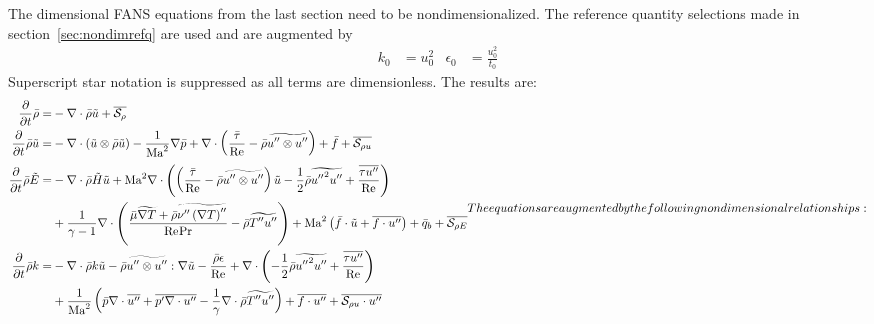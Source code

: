 The dimensional FANS equations from the last section need to be
nondimensionalized.   The reference quantity selections made in
section~\ref{sec:nondimrefq} are used and are augmented by
\begin{align}
  k_0 &= u_{0}^2
&
  \epsilon_0 &= \frac{u_{0}^2}{t_0}
\end{align}
Superscript star notation is suppressed as all terms
are dimensionless.  The results are:
\begin{subequations}
\begin{align}
    \frac{\partial}{\partial{}t}\bar{\rho}
=
 &- \nabla\cdot\bar{\rho}\tilde{u}
  + \overline{\Ssd_{\rho{}}}
\\
    \frac{\partial{}}{\partial{}t}\bar{\rho}\tilde{u}
=
 &- \nabla\cdot(\tilde{u}\otimes\bar{\rho}\tilde{u})
  - \frac{1}{\Mach^2}\nabla{}\bar{p}
  + \nabla\cdot\left(
        \frac{\bar{\tau}}{\Reynolds}
      - \bar{\rho} \widetilde{u''\otimes{}u''}
    \right)
  + \bar{f}
  + \overline{\Ssd_{\rho{} u}}
\\
  \frac{\partial}{\partial{}t} \bar{\rho}\tilde{E}
=
 &- \nabla\cdot\bar{\rho}\tilde{H}\tilde{u}
  + \Mach^{2} \nabla\cdot\left(
        \left(
            \frac{\bar{\tau}}{\Reynolds}
          - \bar{\rho} \widetilde{u''\otimes{}u''}
        \right) \tilde{u}
      - \frac{1}{2}\bar{\rho}\widetilde{{u''}^{2}u''}
      + \frac{\overline{\tau{}u''}}{\Reynolds}
    \right)
\\
 &+ \frac{1}{\gamma-1} \nabla\cdot\left(
      \frac{
         \bar{\mu} \widetilde{\nabla{}T}
       + \bar{\rho} \widetilde{\nu'' \left(\nabla{}T\right)''}
      }{\Reynolds\Prandtl}
      - \bar{\rho} \widetilde{T''u''}
    \right)
  + \Mach^{2} \left(
        \bar{f}\cdot\tilde{u}
      + \overline{f\cdot{}u''}
    \right)
  + \bar{q}_b
  + \overline{\Ssd_{\rho{} E}}
\\
    \frac{\partial{}}{\partial{}t}\bar{\rho}k
=
 &- \nabla\cdot\bar{\rho}k\tilde{u}
  - \bar{\rho} \widetilde{u''\otimes{}u''} : \nabla\tilde{u}
  - \frac{\bar{\rho} \epsilon}{\Reynolds}
  + \nabla\cdot\left(
        -\frac{1}{2}\bar{\rho} \widetilde{{u''}^{2}u''}
      + \frac{\overline{\tau{}u''}}{\Reynolds}
    \right)
\\
 &+ \frac{1}{\Mach^2} \left(
        \bar{p}\nabla\cdot\overline{u''}
      + \overline{p' \nabla\cdot{}u''}
      - \frac{1}{\gamma} \nabla\cdot\bar{\rho} \widetilde{T''u''}
    \right)
  + \overline{f\cdot{}u''}
  + \overline{\Ssd_{\rho{} u}\cdot{}u''}
\end{align}
The equations are augmented by the following nondimensional relationships:

\end{subequations}
